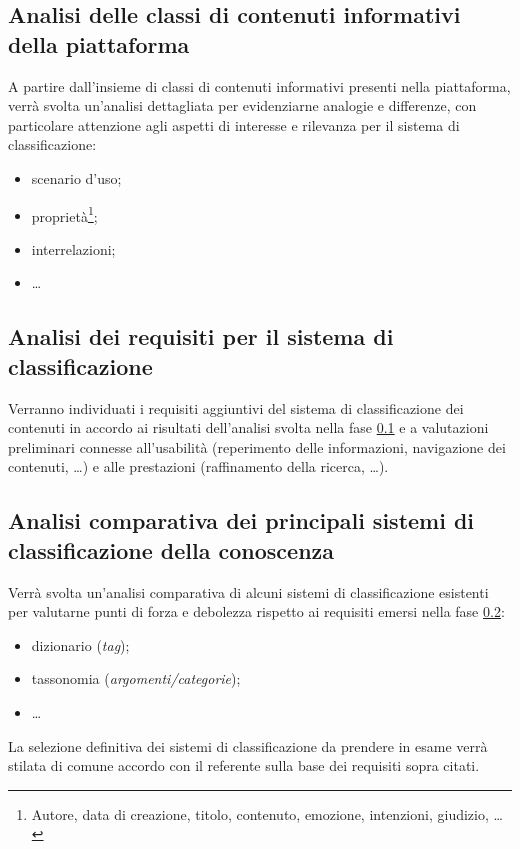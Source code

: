 \documentclass[10pt,a4paper,hidelinks]{scrartcl} %
\begin{document}
	\subsection{Analisi delle classi di contenuti informativi della piattaforma}
	\label{stage::workplan::1}
	A partire dall'insieme di classi di contenuti informativi presenti nella piattaforma, verrà svolta un'analisi dettagliata per evidenziarne analogie e differenze, con particolare attenzione agli aspetti di interesse e rilevanza per il sistema di classificazione:
	\begin{itemize}
		\item scenario d'uso;
		\item proprietà\footnote{Autore, data di creazione, titolo, contenuto, emozione, intenzioni, giudizio, \ldots};
		\item interrelazioni;
		\item \ldots
	\end{itemize}

	\subsection{Analisi dei requisiti per il sistema di classificazione}
	\label{stage::workplan::2}
	Verranno individuati i requisiti aggiuntivi del sistema di classificazione dei contenuti in accordo ai risultati dell'analisi svolta nella fase \ref{stage::workplan::1} e a valutazioni preliminari connesse all'usabilità (reperimento delle informazioni, navigazione dei contenuti, \ldots) e alle prestazioni (raffinamento della ricerca, \ldots).

	\subsection{Analisi comparativa dei principali sistemi di classificazione della conoscenza}
	\label{stage::workplan::3}
	Verrà svolta un'analisi comparativa di alcuni sistemi di classificazione esistenti per valutarne punti di forza e debolezza rispetto ai requisiti emersi nella fase \ref{stage::workplan::2}:
	\begin{itemize}
		\item dizionario (\emph{tag});
		\item tassonomia (\emph{argomenti/categorie});
		\item \ldots
	\end{itemize}
	La selezione definitiva dei sistemi di classificazione da prendere in esame verrà stilata di comune accordo con il referente sulla base dei requisiti sopra citati.
\end{document}
